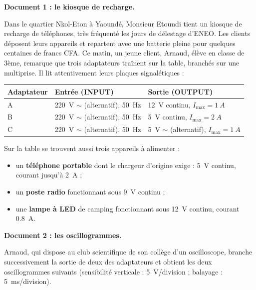 \documentclass[11pt]{article}
\newcounter{popsec}
\newcounter{popsub}
\newcommand{\courssub}[1]{%
  \stepcounter{popsub}%
  \par\vspace{9pt}\noindent{\popxbold\fontsize{11.5}{13}\selectfont\color{popink}{\color{poporange}\thepopsec.\thepopsub}\hspace{6pt}#1}\par\nopagebreak\vspace{4pt}
}
\begin{document}
\courssub{Situation}

\textbf{Document 1 : le kiosque de recharge.}

Dans le quartier Nkol-Eton à Yaoundé, Monsieur Etoundi tient un kiosque de recharge de téléphones, très fréquenté les jours de délestage d'ENEO. Les clients déposent leurs appareils et repartent avec une batterie pleine pour quelques centaines de francs CFA. Ce matin, un jeune client, Arnaud, élève en classe de 3ème, remarque que trois adaptateurs traînent sur la table, branchés sur une multiprise. Il lit attentivement leurs plaques signalétiques :

\begin{center}
\begin{tabularx}{\linewidth}{|l|X|X|}
\hline
\rowcolor{popblueL} \textbf{Adaptateur} & \textbf{Entrée (INPUT)} & \textbf{Sortie (OUTPUT)} \\
\hline
A & \SI{220}{V} $\sim$ (alternatif), \SI{50}{Hz} & \SI{12}{V} continu, $I_{\max} = \SI{1}{A}$ \\
\hline
B & \SI{220}{V} $\sim$ (alternatif), \SI{50}{Hz} & \SI{5}{V} continu, $I_{\max} = \SI{2}{A}$ \\
\hline
C & \SI{220}{V} $\sim$ (alternatif), \SI{50}{Hz} & \SI{5}{V} $\sim$ (alternatif), $I_{\max} = \SI{1}{A}$ \\
\hline
\end{tabularx}
\end{center}

Sur la table se trouvent aussi trois appareils à alimenter :

\begin{itemize}
\item un \textbf{téléphone portable} dont le chargeur d'origine exige : \SI{5}{V} continu, courant jusqu'à \SI{2}{A} ;
\item un \textbf{poste radio} fonctionnant sous \SI{9}{V} continu ;
\item une \textbf{lampe à LED} de camping fonctionnant sous \SI{12}{V} continu, courant \SI{0,8}{A}.
\end{itemize}

\textbf{Document 2 : les oscillogrammes.}

Arnaud, qui dispose au club scientifique de son collège d'un oscilloscope, branche successivement la sortie de deux des adaptateurs et obtient les deux oscillogrammes suivants (sensibilité verticale : \SI{5}{V}/division ; balayage : \SI{5}{ms}/division).
\end{document}
